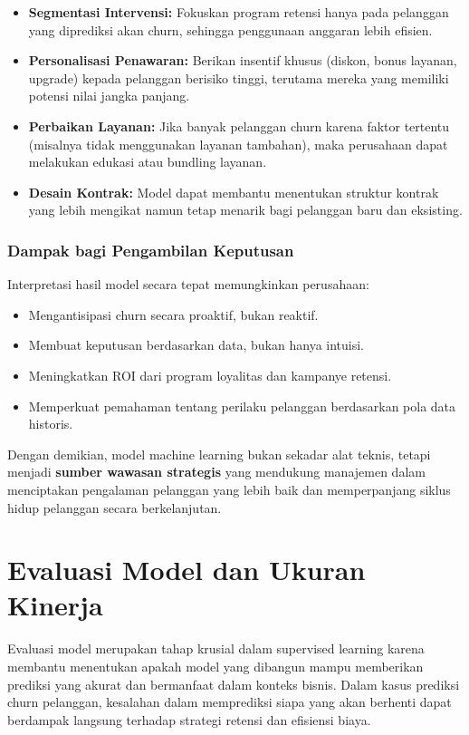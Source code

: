 \begin{itemize}
	\item \textbf{Segmentasi Intervensi:} Fokuskan program retensi hanya pada pelanggan yang diprediksi akan churn, sehingga penggunaan anggaran lebih efisien.
	\item \textbf{Personalisasi Penawaran:} Berikan insentif khusus (diskon, bonus layanan, upgrade) kepada pelanggan berisiko tinggi, terutama mereka yang memiliki potensi nilai jangka panjang.
	\item \textbf{Perbaikan Layanan:} Jika banyak pelanggan churn karena faktor tertentu (misalnya tidak menggunakan layanan tambahan), maka perusahaan dapat melakukan edukasi atau bundling layanan.
	\item \textbf{Desain Kontrak:} Model dapat membantu menentukan struktur kontrak yang lebih mengikat namun tetap menarik bagi pelanggan baru dan eksisting.
\end{itemize}

\subsubsection*{Dampak bagi Pengambilan Keputusan}

Interpretasi hasil model secara tepat memungkinkan perusahaan:
\begin{itemize}
	\item Mengantisipasi churn secara proaktif, bukan reaktif.
	\item Membuat keputusan berdasarkan data, bukan hanya intuisi.
	\item Meningkatkan ROI dari program loyalitas dan kampanye retensi.
	\item Memperkuat pemahaman tentang perilaku pelanggan berdasarkan pola data historis.
\end{itemize}

Dengan demikian, model machine learning bukan sekadar alat teknis, tetapi menjadi \textbf{sumber wawasan strategis} yang mendukung manajemen dalam menciptakan pengalaman pelanggan yang lebih baik dan memperpanjang siklus hidup pelanggan secara berkelanjutan.


\section{Evaluasi Model dan Ukuran Kinerja}

Evaluasi model merupakan tahap krusial dalam supervised learning karena membantu menentukan apakah model yang dibangun mampu memberikan prediksi yang akurat dan bermanfaat dalam konteks bisnis. Dalam kasus prediksi churn pelanggan, kesalahan dalam memprediksi siapa yang akan berhenti dapat berdampak langsung terhadap strategi retensi dan efisiensi biaya.

